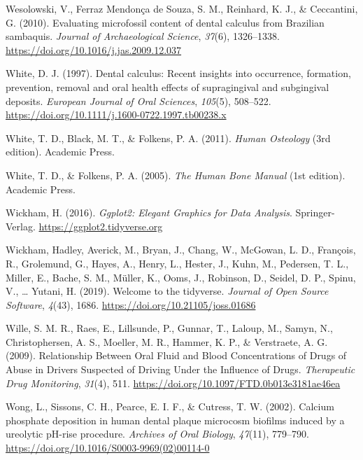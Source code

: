 \documentclass[
  letterpaper,
]{book}
\newlength{\cslhangindent}
\newlength{\cslentryspacingunit} %
\newenvironment{CSLReferences}[2] %
 {%
  \setlength{\parindent}{0pt}
  \ifodd #1
  \let\oldpar\par
  \def\par{\hangindent=\cslhangindent\oldpar}
  \fi
  \setlength{\parskip}{#2\cslentryspacingunit}
 }%
 {}
\begin{document}
\begin{CSLReferences}{1}{0}
\leavevmode{}%
Wesolowski, V., Ferraz Mendonça de Souza, S. M., Reinhard, K. J., \&
Ceccantini, G. (2010). Evaluating microfossil content of dental calculus
from {Brazilian} sambaquis. \emph{Journal of Archaeological Science},
\emph{37}(6), 1326--1338.
\url{https://doi.org/10.1016/j.jas.2009.12.037}

\leavevmode{}%
White, D. J. (1997). Dental calculus: Recent insights into occurrence,
formation, prevention, removal and oral health effects of supragingival
and subgingival deposits. \emph{European Journal of Oral Sciences},
\emph{105}(5), 508--522.
\url{https://doi.org/10.1111/j.1600-0722.1997.tb00238.x}

\leavevmode{}%
White, T. D., Black, M. T., \& Folkens, P. A. (2011). \emph{Human
{Osteology}} (3rd edition). {Academic Press}.

\leavevmode{}%
White, T. D., \& Folkens, P. A. (2005). \emph{The {Human Bone Manual}}
(1st edition). {Academic Press}.

\leavevmode{}%
Wickham, H. (2016). \emph{Ggplot2: {Elegant Graphics} for {Data
Analysis}}. {Springer-Verlag}. \url{https://ggplot2.tidyverse.org}

\leavevmode{}%
Wickham, Hadley, Averick, M., Bryan, J., Chang, W., McGowan, L. D.,
François, R., Grolemund, G., Hayes, A., Henry, L., Hester, J., Kuhn, M.,
Pedersen, T. L., Miller, E., Bache, S. M., Müller, K., Ooms, J.,
Robinson, D., Seidel, D. P., Spinu, V., \ldots{} Yutani, H. (2019).
Welcome to the {tidyverse}. \emph{Journal of Open Source Software},
\emph{4}(43), 1686. \url{https://doi.org/10.21105/joss.01686}

\leavevmode{}%
Wille, S. M. R., Raes, E., Lillsunde, P., Gunnar, T., Laloup, M., Samyn,
N., Christophersen, A. S., Moeller, M. R., Hammer, K. P., \& Verstraete,
A. G. (2009). Relationship {Between Oral Fluid} and {Blood
Concentrations} of {Drugs} of {Abuse} in {Drivers Suspected} of {Driving
Under} the {Influence} of {Drugs}. \emph{Therapeutic Drug Monitoring},
\emph{31}(4), 511. \url{https://doi.org/10.1097/FTD.0b013e3181ae46ea}

\leavevmode{}%
Wong, L., Sissons, C. H., Pearce, E. I. F., \& Cutress, T. W. (2002).
Calcium phosphate deposition in human dental plaque microcosm biofilms
induced by a ureolytic {pH-rise} procedure. \emph{Archives of Oral
Biology}, \emph{47}(11), 779--790.
\url{https://doi.org/10.1016/S0003-9969(02)00114-0}


\end{CSLReferences}
\end{document}
